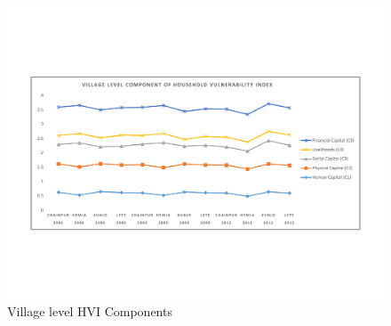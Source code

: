 \newpage
      


	 


	 

\begin{landscape}
	\begin{figure}[h] 
		\vspace{-100pt}
		\includegraphics[scale=0.8]{figure/HVI_Component_Village_Panel}
		\vspace{-50pt}
		\caption{Village level HVI Components} 
		\label{fig:VDClevelhvicomponents}
	\end{figure}
\end{landscape}
	
 
	